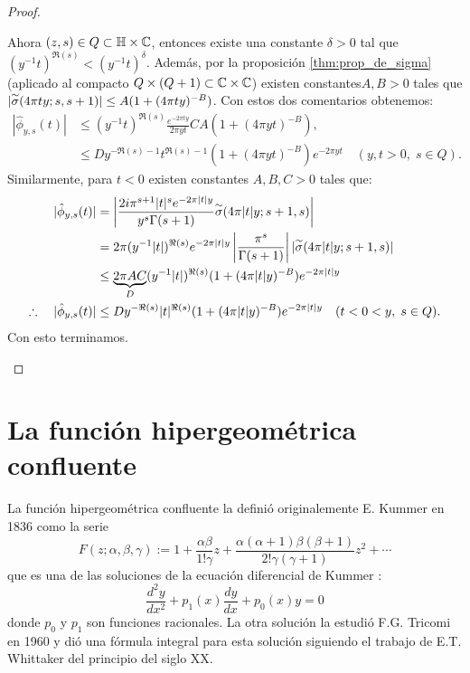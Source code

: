\begin{proof}
\begin{enumerate}[label=\emph{\roman*})]
  Ahora $(z,s)\in Q\subset\mathbb{H}\times\mathbb{C}$, entonces existe una constante $\delta>0$ tal que
  $(y^{-1}t)^{\Re(s)}<(y^{-1}t)^{\delta}$.
  Adem\'as, por la proposici\'on \ref{thm:prop_de_sigma} (aplicado al compacto
  $Q\times(Q+1)\subset\mathbb{C}\times\mathbb{C}$) existen constantes$A,B>0$ tales que
  $|\overset{\sim}{\sigma}(4\pi ty;s,s+1)|\leq A(1+(4\pi ty)^{-B})$. Con estos dos comentarios obtenemos:
  \begin{align}
    |\hat{\phi}_{y,s}(t)|
    &\leq (y^{-1}t)^{\Re(s)}\frac{e^{-2\pi ty}}{2\pi yt}
      C A(1+(4\pi yt)^{-B}),\nonumber\\
    &\leq D y^{-\Re(s)-1}t^{\Re(s)-1}(1+(4\pi yt)^{-B})e^{-2\pi yt}\quad(y,t>0,\;s\in Q).
      \label{eq:phihatabsapprox}
  \end{align}
  Similarmente, para $t<0$ existen constantes $A,B,C>0$ tales que:
  \begin{align*}
    |\hat{\phi}_{y,s}(t)|
    &=\left| \dfrac{2i\pi^{s+1}|t|^se^{-2\pi|t|y}}{y^s\Gamma(s+1)}\overset{\sim}{\sigma}(4\pi|t|y;s+1,s) \right|\\
    &=2\pi(y^{-1}|t|)^{\Re(s)}e^{-2\pi|t|y}\left| \frac{\pi^s}{\Gamma(s+1)} \right||\overset{\sim}{\sigma}(4\pi|t|y;s+1,s)|\\
    &\leq \underset{D}{\underbrace{2\pi AC}}(y^{-1}|t|)^{\Re(s)}(1+(4\pi |t|y)^{-B})e^{-2\pi|t|y}\\
    \therefore\quad |\hat{\phi}_{y,s}(t)|
    &\leq D y^{-\Re(s)}|t|^{\Re(s)}(1+(4\pi |t|y)^{-B})e^{-2\pi|t|y} \quad(t<0<y,\; s\in Q).
  \end{align*}
  Con esto terminamos.
\end{enumerate}
\end{proof}


\section{La funci\'on hipergeom\'etrica confluente}\label{ap:fun_hipergeo_conf}
La funci\'on hipergeom\'etrica confluente la defini\'o originalemente E. Kummer en 1836 como la serie
\[
  F(z;\alpha,\beta,\gamma):=1+\frac{\alpha\beta}{1!\gamma}z+
  \frac{\alpha(\alpha+1)\beta(\beta+1)}{2!\gamma(\gamma+1)}z^2+\cdots
\]
que es una de las soluciones de la ecuaci\'on diferencial de Kummer \cite{Kummer1836}:
\[
  \frac{d^2y}{dx^2}+p_1(x)\frac{dy}{dx}+p_0(x)y=0
\]
donde $p_0$ y $p_1$ son funciones racionales. La otra soluci\'on la estudi\'o F.G. Tricomi en
1960 y di\'o una f\'ormula integral para esta soluci\'on \cite[\S2]{TricomiFHC} siguiendo el
trabajo de E.T. Whittaker del principio del siglo XX.

